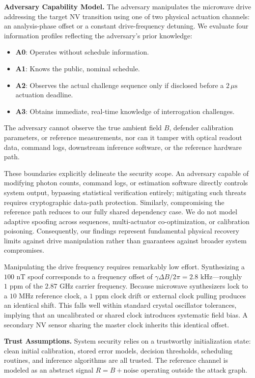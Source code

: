 \documentclass[conference]{IEEEtran}
\begin{document}
\textbf{Adversary Capability Model.} The adversary manipulates the microwave drive addressing the target NV transition using one of two physical actuation channels: an analysis-phase offset or a constant drive-frequency detuning. We evaluate four information profiles reflecting the adversary's prior knowledge:
\begin{itemize}
\item \textbf{A0}: Operates without schedule information.
\item \textbf{A1}: Knows the public, nominal schedule.
\item \textbf{A2}: Observes the actual challenge sequence only if disclosed before a $2\,\mu\text{s}$ actuation deadline.
\item \textbf{A3}: Obtains immediate, real-time knowledge of interrogation challenges.
\end{itemize}
The adversary cannot observe the true ambient field $B$, defender calibration parameters, or reference measurements, nor can it tamper with optical readout data, command logs, downstream inference software, or the reference hardware path.

These boundaries explicitly delineate the security scope. An adversary capable of modifying photon counts, command logs, or estimation software directly controls system output, bypassing statistical verification entirely; mitigating such threats requires cryptographic data-path protection. Similarly, compromising the reference path reduces to our fully shared dependency case. We do not model adaptive spoofing across sequences, multi-actuator co-optimization, or calibration poisoning. Consequently, our findings represent fundamental physical recovery limits against drive manipulation rather than guarantees against broader system compromises.

Manipulating the drive frequency requires remarkably low effort. Synthesizing a $100\text{~nT}$ spoof corresponds to a frequency offset of $\gamma\Delta B / 2\pi = 2.8\text{~kHz}$—roughly $1\text{~ppm}$ of the $2.87\text{~GHz}$ carrier frequency. Because microwave synthesizers lock to a $10\text{~MHz}$ reference clock, a $1\text{~ppm}$ clock drift or external clock pulling produces an identical shift. This falls well within standard crystal oscillator tolerances, implying that an uncalibrated or shared clock introduces systematic field bias. A secondary NV sensor sharing the master clock inherits this identical offset.

\textbf{Trust Assumptions.} System security relies on a trustworthy initialization state: clean initial calibration, stored error models, decision thresholds, scheduling routines, and inference algorithms are all trusted. The reference channel is modeled as an abstract signal $R = B + \text{noise}$ operating outside the attack graph.
\end{document}
